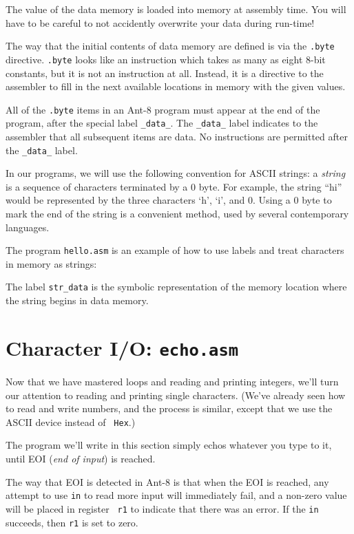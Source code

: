 The value of the data memory is loaded into memory at assembly time. 
You will have to be careful to not accidently overwrite your data
during run-time!

The way that the initial contents of data memory are defined is via
the {\tt .byte} directive.  {\tt .byte} looks like an instruction
which takes as many as eight 8-bit constants, but it is not an
instruction at all.  Instead, it is a directive to the assembler to
fill in the next available locations in memory with the given
values.

All of the {\tt .byte} items in an {\sc Ant-8} program must appear at
the end of the program, after the special label {\tt \_data\_}.  The
{\tt \_data\_} label indicates to the assembler that all subsequent
items are data.  No instructions are permitted after the {\tt \_data\_}
label.

In our programs, we will use the following convention for {\sc ASCII}
strings:  a {\em string} is a sequence of characters terminated by a 0
byte.  For example, the string ``hi'' would be represented by the
three characters `h', `i', and 0.  Using a 0 byte to mark the end
of the string is a convenient method, used by several contemporary
languages.

The program {\tt hello.asm} is an example of how to use labels and
treat characters in memory as strings:



The label {\tt str\_data} is the symbolic representation of the
memory location where the string begins in data memory.

\section{Character I/O: {\tt echo.asm}}
\label{echo-sec}

Now that we have mastered loops and reading and printing integers,
we'll turn our attention to reading and printing single characters. 
(We've already seen how to read and write numbers, and the process is
similar, except that we use the {\sc ASCII} device instead of {\tt
Hex}.)

The program we'll write in this section simply echos whatever you type
to it, until EOI ({\em end of input}) is reached.

The way that EOI is detected in {\sc Ant-8} is that when the EOI is
reached, any attempt to use {\tt in} to read more input will
immediately fail, and a non-zero value will be placed in register {\tt
r1} to indicate that there was an error.  If the {\tt in} succeeds,
then {\tt r1} is set to zero. 

